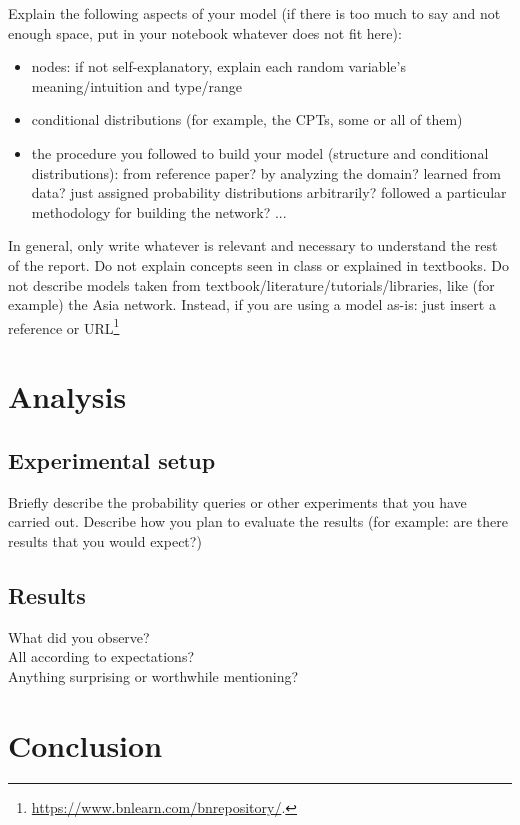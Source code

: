 \documentclass[letterpaper]{article}
\begin{document}
Explain the following aspects of your model (if there is too much to say and not enough space, put in your notebook whatever does not fit here):
\begin{itemize}
    \item nodes: if not self-explanatory, explain each random variable's meaning/intuition and type/range
    \item conditional distributions (for example, the CPTs, some or all of them)
    \item the procedure you followed to build your model (structure and conditional distributions): from reference paper? by analyzing the domain? learned from data? just assigned probability distributions arbitrarily? followed a particular methodology for building the network? ...
\end{itemize}  
In general, only write whatever is relevant and necessary to understand the rest of the report. Do not explain concepts seen in class or explained in textbooks. Do not describe models taken from textbook/literature/tutorials/libraries, like (for example) the Asia network. Instead, if you are using a model as-is: just insert a reference or URL\footnote{\url{https://www.bnlearn.com/bnrepository/}.}

\section{Analysis}

\subsection{Experimental setup}

Briefly describe the probability queries or other experiments that you have carried out. Describe how you plan to evaluate the results (for example: are there results that you would expect?)

\subsection{Results}

What did you observe? \\
All according to expectations? \\
Anything surprising or worthwhile mentioning?

\section{Conclusion}
\end{document}
